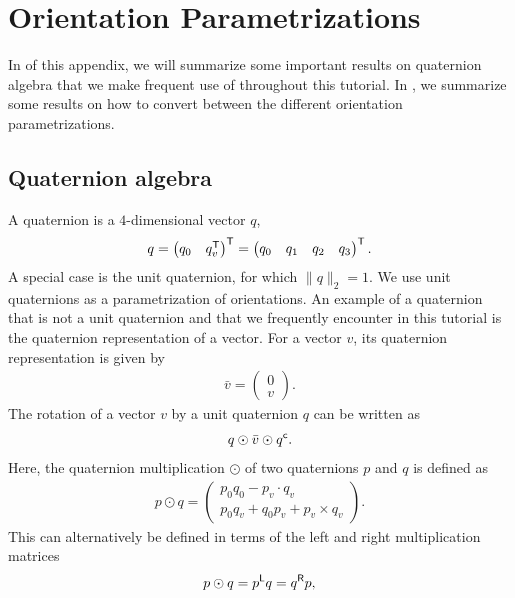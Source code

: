 \chapter{Orientation Parametrizations}
\label{app:rotation}
In  of this appendix, we will summarize some important results on quaternion algebra that we make frequent use of throughout this tutorial. In , we summarize some results on how to convert between the different orientation parametrizations. 

\section{Quaternion algebra}
\label{sec:app-rotation-quatAlg}
A quaternion is a $4$-dimensional vector $q$, 
\begin{align}
q = \begin{pmatrix} q_0 & q_v^{\mathsf{T}} \end{pmatrix}^{\mathsf{T}} = \begin{pmatrix} q_0 & q_1 & q_2 & q_3 \end{pmatrix}^{\mathsf{T}}.
\end{align}
A special case is the unit quaternion, for which $\| q\|_2 = 1$. We use unit quaternions as a parametrization of orientations. An example of a quaternion that is not a unit quaternion and that we frequently encounter in this tutorial is the quaternion representation of a vector. For a vector $v$, its quaternion representation is given by 
\begin{align}
\bar{v} = 
\begin{pmatrix} 
0 \\ v
\end{pmatrix}.
\end{align}
The rotation of a vector $v$ by a unit quaternion $q$ can be written as
\begin{align}
q \odot \bar{v} \odot q^{\mathsf{c}}.
\end{align}
Here, the quaternion multiplication $\odot$ of two quaternions $p$ and $q$ is defined as
\begin{align}
p \odot q = \begin{pmatrix} p_0 q_0 - p_v \cdot q_v \\ p_0 q_v + q_0 p_v + p_v \times q_v \end{pmatrix}.
\end{align}
This can alternatively be defined in terms of the left and right multiplication matrices
\begin{align} 
p \odot q = p^{\mathsf{L}} q = q^{\mathsf{R}} p,
\end{align}
